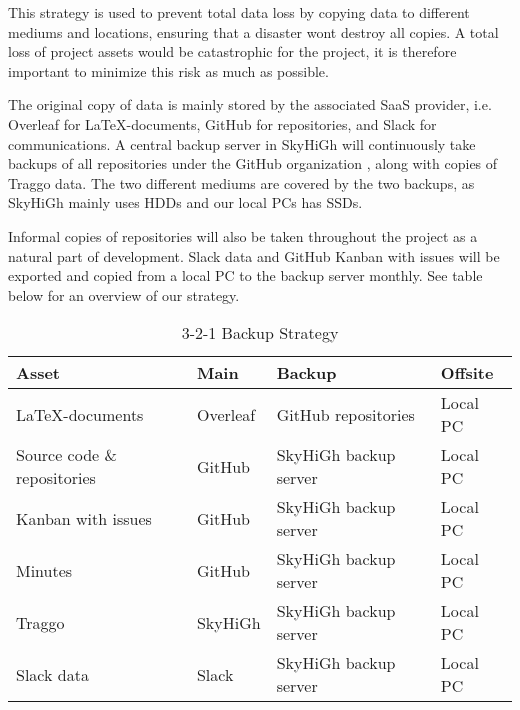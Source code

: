 This strategy is used to prevent total data loss by copying data to different mediums and locations, ensuring that a disaster wont destroy all copies. A total loss of project assets would be catastrophic for the project, it is therefore important to minimize this risk as much as possible. 

The original copy of data is mainly stored by the associated SaaS provider, i.e. Overleaf for \LaTeX-documents, GitHub for repositories, and Slack for communications. A central backup server in SkyHiGh will continuously take backups of all repositories under the GitHub organization \cite{github_org}, along with copies of Traggo data. The two different mediums are covered by the two backups, as SkyHiGh mainly uses HDDs and our local PCs has SSDs. 

Informal copies of repositories will also be taken throughout the project as a natural part of development. Slack data and GitHub Kanban with issues will be exported and copied from a local PC to the backup server monthly.
See table below for an overview of our strategy. 

\begin{table} [H]
    \centering
    \begin{tabular}{|l|l|l|l|}
    \hline
    \textbf{Asset} & \textbf{Main} & \textbf{Backup} & \textbf{Offsite} \\
    \hline
    \LaTeX-documents & Overleaf & GitHub repositories & Local PC \\
    Source code \& repositories & GitHub \cite{github_org} & SkyHiGh backup server & Local PC \\
    Kanban with issues & GitHub \cite{github_org} & SkyHiGh backup server & Local PC \\
    Minutes & GitHub \cite{github_org} & SkyHiGh backup server & Local PC \\
    Traggo & SkyHiGh & SkyHiGh backup server & Local PC \\
    Slack data & Slack & SkyHiGh backup server & Local PC \\
    \hline
    \end{tabular}
    \caption{3-2-1 Backup Strategy}
    \label{tab:tools}
\end{table}

